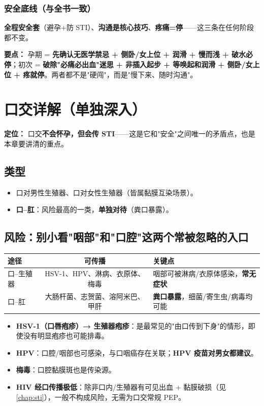 \documentclass[12pt,UTF8,openany]{ctexbook}
\begin{document}
\subsection{安全底线（与全书一致）}

\textbf{全程安全套}（避孕+防 STI）、\textbf{沟通是核心技巧}、\textbf{疼痛=停}——这三条在任何阶段都不变。

\vspace{1em}
\noindent\textbf{要点：} 孕期 = \textbf{先确认无医学禁忌 + 侧卧/女上位 + 润滑 + 慢而浅 + 破水必停}；初次 = \textbf{破除"必痛必出血"迷思 + 非插入起步 + 等唤起和润滑 + 侧卧/女上位 + 疼就停}。两者都不是"硬闯"，而是"慢下来、随时沟通"。

\chapter{口交详解（单独深入）}
\label{chap:oral}

\noindent\textbf{定位：} 口交\textbf{不会怀孕，但会传 STI}——这是它和"安全"之间唯一的矛盾点，也是本章要讲清的重点。

\section{类型}

\begin{itemize}[leftmargin=2em,itemsep=0.3em]
  \item 口对男性生殖器、口对女性生殖器（皆属黏膜互染场景）。
  \item \textbf{口--肛}：风险最高的一类，\textbf{单独对待}（粪口暴露）。
\end{itemize}

\section{风险：别小看"咽部"和"口腔"这两个常被忽略的入口}

\begin{tabularx}{\textwidth}{lC X}
\toprule
途径 & 可传播 & 关键点 \\
\midrule
口--生殖器 & HSV-1、HPV、淋病、衣原体、梅毒 & 咽部可被淋病/衣原体感染，\textbf{常无症状} \\
口--肛 & 大肠杆菌、志贺菌、溶阿米巴、甲肝 & \textbf{粪口暴露}，细菌/寄生虫/病毒均可能 \\
\bottomrule
\end{tabularx}

\vspace{0.5em}
\begin{itemize}[leftmargin=2em,itemsep=0.3em]
  \item \textbf{HSV-1（口唇疱疹）→ 生殖器疱疹}：是最常见的"由口传到下身"的情形，即使没有明显疱疹也可能排毒。
  \item \textbf{HPV}：口腔/咽部也可感染，与口咽癌存在关联；\textbf{HPV 疫苗对男女都建议}。
  \item \textbf{梅毒}：口腔黏膜斑也是传染源。
  \item \textbf{HIV 经口传播极低}：除非口内/生殖器有可见出血 + 黏膜破损（见\ref{chap:sti}），一般不构成风险，无需为口交常规 PEP。
\end{itemize}
\end{document}
